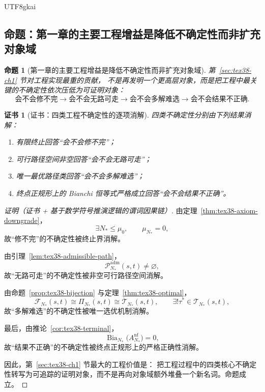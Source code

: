 \documentclass[12pt]{article}
\newtheorem{proposition}{命题}[section]
\newtheorem{Certificate}{证书}[section]
\newcommand{\Bia}{\operatorname{Bia}}
\begin{document}
\begin{CJK*}{UTF8}{gkai}
\subsection{命题：第一章的主要工程增益是降低不确定性而非扩充对象域}
\label{subsec:tex38-engineering-proposition}

\begin{proposition}[第一章的主要工程增益是降低不确定性而非扩充对象域]
\label{prop:tex38-engineering-uncertainty}
第~\ref{sec:tex38-ch1} 节对工程实现最重的贡献，
不是再发明一个更高层对象，而是把工程中最关键的不确定性依次压低为可证明对象：
\[
  \text{会不会修不完}
  \to
  \text{会不会无路可走}
  \to
  \text{会不会多解难选}
  \to
  \text{会不会结果不正确}.
\]
\end{proposition}

\begin{Certificate}[证书：四类工程不确定性的逐项消解]
\label{cert:tex38-engineering-uncertainty}
四类不确定性分别由下列结果消解：
\begin{enumerate}
  \item 有限终止回答“会不会修不完”；
  \item 可行路径空间非空回答“会不会无路可走”；
  \item 唯一最优路径类回答“会不会多解难选”；
  \item 终点正规形上的 Bianchi 恒等式严格成立回答“会不会结果不正确”。
\end{enumerate}
\end{Certificate}

\begin{proof}[证明（证书 + 基于数学符号推演逻辑的谓词因果链）]
由定理~\ref{thm:tex38-axiom-downgrade}，
\[
  \exists N_\ast\le\mu_0,\qquad \mu_{N_\ast}=0,
\]
故“修不完”的不确定性被终止界消解。

由引理~\ref{lem:tex38-admissible-path}，
\[
  \mathcal{P}_{N_\ast}^{\mathrm{adm}}(s,t)\neq\varnothing,
\]
故“无路可走”的不确定性被非空可行路径空间消解。

由命题~\ref{prop:tex38-bijection} 与定理~\ref{thm:tex38-optimal}，
\[
  \mathcal{F}_{N_\ast}(s,t)\cong \Pi_{N_\ast}(s,t)\cong \mathcal{T}_{N_\ast}(s,t),
  \qquad
  \exists!\tau^\ast\in\mathcal{T}_{N_\ast}(s,t),
\]
故“多解难选”的不确定性被唯一选优机制消解。

最后，由推论~\ref{cor:tex38-terminal}，
\[
  \Bia_{N_\ast}\bigl(A_{N_\ast}^{\mathrm{nf}}\bigr)=0,
\]
故“结果不正确”的不确定性被终点正规形上的严格正确性消解。

因此，第~\ref{sec:tex38-ch1} 节最大的工程价值是：
把工程过程中的四类核心不确定性转写为可追踪的证明对象，而不是再向对象域额外堆叠一个新名词。命题成立。
\end{proof}


\end{CJK*}
\end{document}
